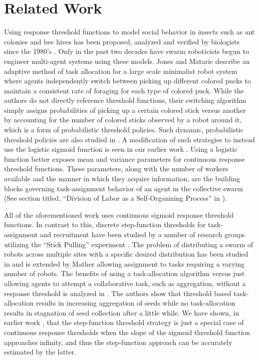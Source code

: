 \documentclass[conference]{ieeeconf}
\begin{document}
\section{Related Work}\label{subsec:rw}
Using response threshold functions to model social behavior in insects such as ant colonies \cite{Bonabeau1996, Bonabeau1997} and bee hives \cite{Robinson1987, Robinson1992, PageJr1990} has been proposed, analyzed and verified by biologists since the 1980's \cite{Theraulaz1998}. Only in the past two decades have swarm roboticists begun to engineer multi-agent systems using these models. Jones and Mataric \cite{Jones2004} describe an adaptive method of task allocation for a large scale minimalist robot system where agents independently switch between picking up different colored pucks to maintain a consistent rate of foraging for each type of colored puck. While the authors do not directly reference threshold functions, their switching algorithm simply assigns probabilities of picking up a certain colored stick versus another by accounting for the number of colored sticks observed by a robot around it, which is a form of probabilistic threshold policies. Such dynamic, probabilistic threshold policies are also studied in \cite{Nouyan2002}. A modification of such strategies to instead use the logistic sigmoid function is seen in our earlier work \cite{Kanakia2014}. Using a logistic function better exposes mean and variance parameters for continuous response threshold functions. These parameters, along with the number of workers available and the manner in which they acquire information, are the building blocks governing task-assignment behavior of an agent in the collective swarm (See section titled, ``Division of Labor as a Self-Organizing Process'' in \cite{Robinson1992}). 

All of the aforementioned work uses continuous sigmoid response threshold functions. In contrast to this, discrete step-function thresholds for task-assignment and recruitment have been studied by a number of research groups utilizing the ``Stick Pulling'' experiment \cite{Martinoli1995, Martinoli1998, Lerman2001, Martinoli2004}. The problem of distributing a swarm of robots across multiple sites with a specific desired distribution has been studied in \cite{Berman2009, Correll2008} and is extended by Mather \cite{Mather2010} allowing assignment to tasks requiring a varying number of robots. The benefits of using a task-allocation algorithm versus just allowing agents to attempt a collaborative task, such as aggregation, without a response threshold is analyzed in \cite{Agassounon2001}. The authors show that threshold based task-allocation results in increasing aggregation of seeds while no task-allocation results in stagnation of seed collection after a little while. We have shown, in earlier work \cite{Kanakia2014}, that the step-function threshold strategy is just a special case of continuous response thresholds when the slope of the sigmoid threshold function approaches infinity, and thus the step-function approach can be accurately estimated by the latter.
\end{document}
